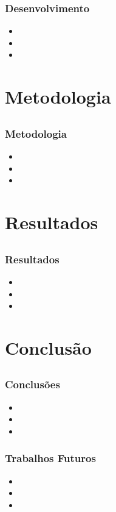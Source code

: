\documentclass{beamer}
\begin{document}
\begin{frame}
	\frametitle{Desenvolvimento}

	\begin{itemize}
		\item
		\item
		\item
	\end{itemize}
\end{frame}

\section{Metodologia}
\subsection*{}

\begin{frame}
	\frametitle{Metodologia}

	\begin{itemize}
		\item
		\item
		\item
	\end{itemize}
\end{frame}

\section{Resultados}
\subsection*{}

\begin{frame}
	\frametitle{Resultados}

	\begin{itemize}
		\item
		\item
		\item
	\end{itemize}
\end{frame}

\section{Conclusão}
\subsection*{}

\begin{frame}
	\frametitle{Conclusões}

	\begin{itemize}
		\item
		\item
		\item
	\end{itemize}
\end{frame}

\begin{frame}
	\frametitle{Trabalhos Futuros}

	\begin{itemize}
		\item
		\item
		\item
	\end{itemize}
\end{frame}
\end{document}
